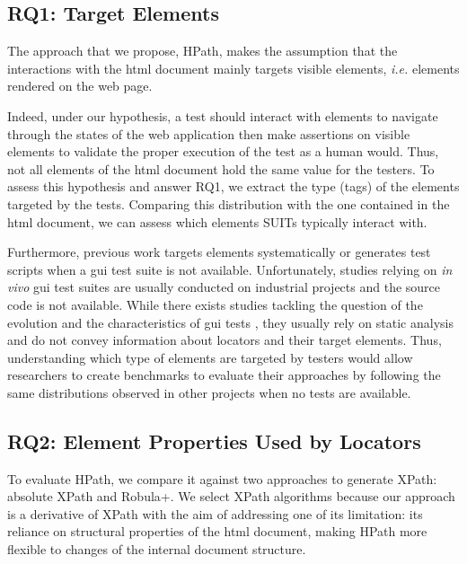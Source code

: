 \subsection{RQ1: Target Elements}
\label{sec:hpath-protocol-rq1}

The approach that we propose, HPath, makes the assumption that the interactions with the \gls{html} document mainly targets visible elements, \emph{i.e.} elements rendered on the web page. 

Indeed, under our hypothesis, a test should interact with elements to navigate through the states of the web application then make assertions on visible elements to validate the proper execution of the test as a human would. Thus, not all elements of the \gls{html} document hold the same value for the testers. To assess this hypothesis and answer RQ1, we extract the type (tags) of the elements targeted by the tests. Comparing this distribution with the one contained in the \gls{html} document, we can assess which elements SUITs typically interact with. 

Furthermore, previous work targets elements systematically\cite{Cohen2015, Leotta2015, Aldalur2017, Eladawy2018} or generates test scripts\cite{Grechanik2009, Montoto2011, Kirinuki2019} when a \gls{gui} test suite is not available. Unfortunately, studies relying on \emph{in vivo} \gls{gui} test suites are usually conducted on industrial projects and the source code is not available\cite{Thummalapenta2013, Yandrapally2014}. While there exists studies tackling the question of the evolution and the characteristics of \gls{gui} tests \cite{Christophe2014}, they usually rely on static analysis and do not convey information about locators and their target elements. Thus, understanding which type of elements are targeted by testers would allow researchers to create benchmarks to evaluate their approaches by following the same distributions observed in other projects when no tests are available.

\subsection{RQ2: Element Properties Used by Locators}
\label{sec:hpath-protocol-rq2}

To evaluate HPath, we compare it against two approaches to generate XPath: absolute XPath and Robula+. We select XPath algorithms because our approach is a derivative of XPath with the aim of addressing one of its limitation: its reliance on structural properties of the \gls{html} document, making HPath more flexible to changes of the internal document structure.

